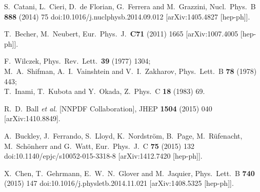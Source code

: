 \documentclass[12pt]{article}
\begin{document}
\begin{thebibliography}{99}
  S.~Catani, L.~Cieri, D.~de Florian, G.~Ferrera and M.~Grazzini,
  Nucl.\ Phys.\ B {\bf 888} (2014) 75
  doi:10.1016/j.nuclphysb.2014.09.012
  [arXiv:1405.4827 [hep-ph]].
  

  T.~Becher, M.~Neubert,
  Eur.\ Phys.\ J.\  {\bf C71 } (2011)  1665
[arXiv:1007.4005 [hep-ph]].


  F.~Wilczek,
  Phys.\ Rev.\ Lett.\  {\bf 39} (1977) 1304;\\
 M.~A.~Shifman, A.~I.~Vainshtein and V.~I.~Zakharov,
  Phys.\ Lett.\ B {\bf 78} (1978) 443;\\
  T.~Inami, T.~Kubota and Y.~Okada,
  Z.\ Phys.\ C {\bf 18} (1983) 69.

  
   R.~D.~Ball {\it et al.} [NNPDF Collaboration],
  JHEP {\bf 1504} (2015) 040
  [arXiv:1410.8849].

  A.~Buckley, J.~Ferrando, S.~Lloyd, K.~Nordström, B.~Page, M.~Rüfenacht, M.~Schönherr and G.~Watt,
  Eur.\ Phys.\ J.\ C {\bf 75} (2015) 132
  doi:10.1140/epjc/s10052-015-3318-8
  [arXiv:1412.7420 [hep-ph]].

  
  X.~Chen, T.~Gehrmann, E.~W.~N.~Glover and M.~Jaquier,
  Phys.\ Lett.\ B {\bf 740} (2015) 147
  doi:10.1016/j.physletb.2014.11.021
  [arXiv:1408.5325 [hep-ph]].
  

\end{thebibliography}
\end{document}
